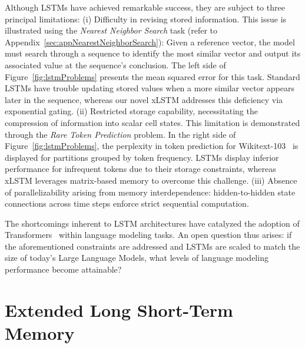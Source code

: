 Although LSTMs have achieved remarkable success, they are subject to three principal limitations: (i) Difficulty in revising stored information. This issue is illustrated using the {\it Nearest Neighbor Search} task (refer to Appendix~\ref{sec:appNearestNeighborSearch}): Given a reference vector, the model must search through a sequence to identify the most similar vector and output its associated value at the sequence’s conclusion. The left side of Figure~\ref{fig:lstmProblems} presents the mean squared error for this task. Standard LSTMs have trouble updating stored values when a more similar vector appears later in the sequence, whereas our novel xLSTM addresses this deficiency via exponential gating. (ii) Restricted storage capability, necessitating the compression of information into scalar cell states. This limitation is demonstrated through the {\it Rare Token Prediction} problem. In the right side of Figure~\ref{fig:lstmProblems}, the perplexity in token prediction for Wikitext-103~\citep{Merity:17} is displayed for partitions grouped by token frequency. LSTMs display inferior performance for infrequent tokens due to their storage constraints, whereas xLSTM leverages matrix-based memory to overcome this challenge. (iii) Absence of parallelizability arising from memory interdependence: hidden-to-hidden state connections across time steps enforce strict sequential computation.

The shortcomings inherent to LSTM architectures have catalyzed the adoption of Transformers~\citep{Vaswani:17} within language modeling tasks. An open question thus arises: if the aforementioned constraints are addressed and LSTMs are scaled to match the size of today’s Large Language Models, what levels of language modeling performance become attainable?

\section{Extended Long Short-Term Memory}
\label{sec:xLSTM}


